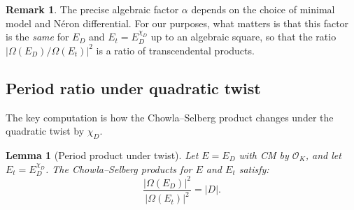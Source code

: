 \documentclass[12pt,a4paper]{article}
\theoremstyle{plain}
\newtheorem{lemma}[theorem]{Lemma}
\theoremstyle{definition}
\newtheorem{remark}[theorem]{Remark}
\newcommand{\OK}{\mathcal{O}_K}
\begin{document}
\begin{remark}
The precise algebraic factor $\alpha$ depends on the choice of minimal model
and N\'eron differential.  For our purposes, what matters is that this factor
is the \emph{same} for $E_D$ and $E_t = E_D^{\chi_D}$ up to an algebraic
square, so that the ratio $|\Omega(E_D)/\Omega(E_t)|^2$ is a ratio of
transcendental products.
\end{remark}

\subsection{Period ratio under quadratic twist}

The key computation is how the Chowla--Selberg product changes under the
quadratic twist by $\chi_D$.

\begin{lemma}[Period product under twist]
\label{lem:twist}
Let $E = E_D$ with CM by $\OK$, and let $E_t = E_D^{\chi_D}$.
The Chowla--Selberg products for $E$ and $E_t$ satisfy:
\[
  \frac{|\Omega(E_D)|^2}{|\Omega(E_t)|^2} = |D|.
\]
\end{lemma}
\end{document}
